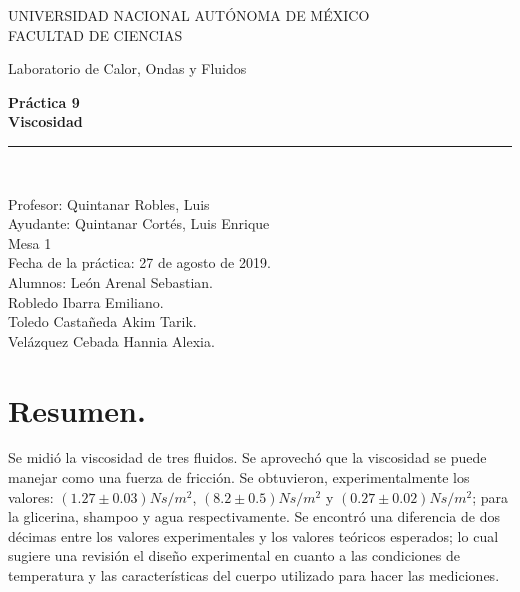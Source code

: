\documentclass[a4paper]{article}
\begin{document}
\begin{titlepage}
\begin{center}
\begin{figure}
\end{figure}
\vspace*{0.5in}
UNIVERSIDAD NACIONAL AUTÓNOMA DE MÉXICO\\
\vspace*{0.2in}
FACULTAD DE CIENCIAS \\
\vspace*{0.5in}
\begin{large}
Laboratorio de Calor, Ondas y Fluidos\\
\end{large}
\vspace*{0.2in}
\begin{Large}
\textbf{Práctica 9} \\
\textbf{Viscosidad} \\
\end{Large}
\vspace*{0.3in}
\vspace*{0.3in}
\rule{80mm}{0.1mm}\\
\vspace*{0.1in}
\begin{large}
Profesor:  Quintanar Robles, Luis  \\
Ayudante: Quintanar Cortés, Luis Enrique \\
Mesa 1\\
Fecha de la práctica: 27 de agosto de 2019.\\
Alumnos: León Arenal Sebastian.\\
Robledo Ibarra Emiliano. \\
Toledo Castañeda Akim Tarik.\\
Velázquez Cebada Hannia Alexia.\\

\end{large}
\end{center}
\end{titlepage}



\section*{Resumen.}
Se midió la viscosidad de tres fluidos. Se aprovechó que la viscosidad se puede manejar como una fuerza de fricción. Se obtuvieron, experimentalmente los valores: $(1.27\pm0.03) Ns/m^2$, $(8.2\pm0.5) Ns/m^2$ y $(0.27\pm0.02) Ns/m^2$; para la glicerina, shampoo y agua respectivamente. Se encontró una diferencia de dos décimas entre los valores experimentales y los valores teóricos esperados; lo cual sugiere una revisión el diseño experimental en cuanto a las condiciones de temperatura y las características del cuerpo utilizado para hacer las mediciones.
\end{document}
